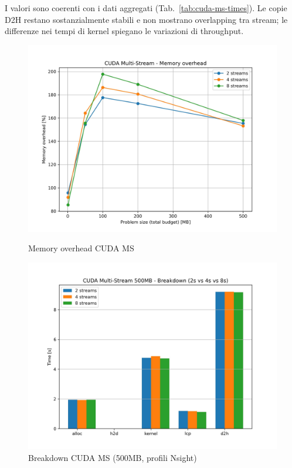			I valori sono coerenti con i dati aggregati (Tab.~\ref{tab:cuda-ms-times}). Le copie D2H restano sostanzialmente stabili e non mostrano overlapping tra stream; le differenze nei tempi di kernel spiegano le variazioni di throughput.
			
			\begin{figure}[H]
				\centering
				\begin{minipage}[t]{0.49\textwidth}
					\centering
					\includegraphics[width=\textwidth]{img/cuda_ms_plots/cuda_ms_memory_overhead.jpg}
					\caption{Memory overhead CUDA MS}
					\label{fig:cuda_ms_mem_overhead}
				\end{minipage}
				\hfill
				\begin{minipage}[t]{0.49\textwidth}
					\centering
					\includegraphics[width=\textwidth]{img/cuda_ms_plots/cuda_ms_breakdown_500MB.jpg}
					\caption{Breakdown CUDA MS (500MB, profili Nsight)}
					\label{fig:cuda_ms_breakdown}
				\end{minipage}
			\end{figure}
		
